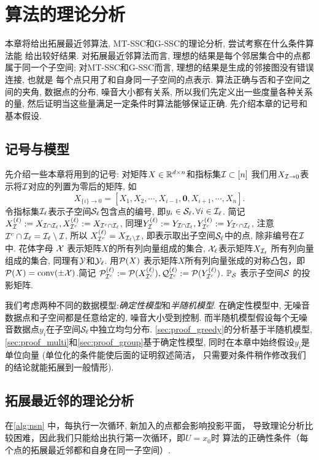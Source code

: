 \chapter{算法的理论分析}\label{chp:theory}
本章将给出拓展最近邻算法, MT-SSC和G-SSC的理论分析, 尝试考察在什么条件算法能
给出较好结果. 对拓展最近邻算法而言, 理想的结果是每个邻居集合中的点都属于同一个子空间;
对MT-SSC和G-SSC而言, 理想的结果是生成的邻接图没有错误连接, 也就是
每个点只用了和自身同一子空间的点表示. 算法正确与否和子空间之间的夹角, 
数据点的分布, 噪音大小都有关系, 所以我们先定义出一些度量各种关系的量,
然后证明当这些量满足一定条件时算法能够保证正确. 先介绍本章的记号和基本假设.

\section{记号与模型}
先介绍一些本章将用到的记号:
对矩阵\(X\in\mathbb{R}^{d\times n}\)和指标集\(\mathcal{I} \subset [n]\)
我们用\(X_{\mathcal{I}\rightarrow 0}\)表示将\(\mathcal{I}\)对应的列置为零后的矩阵,
如
\[
  X_{\{i\}\rightarrow 0} = \left[ X_1, X_2, \cdots, X_{i-1}, \mathbf{0},
  X_{i+1}, \cdots, X_n \right].
\]
令指标集\(\mathcal{I}_\ell\)表示子空间\(\mathcal{S}_\ell\)包含点的编号,
即\(y_i\in \mathcal{S}_\ell, \forall i\in \mathcal{I}_\ell\).
简记\(X_{\mathcal{I}}^{(\ell)}:=X_{\mathcal{I}\cap\mathcal{I}_\ell}, X_{\mathcal{I}^c}^{(\ell)}:=X_{\mathcal{I}^c\cap \mathcal{I}_\ell}\),
同理\(Y_{\mathcal{I}}^{(\ell)}:=Y_{\mathcal{I}\cap \mathcal{I}_\ell}, Y_{\mathcal{I}^c}^{(\ell)}:=Y_{\mathcal{I}^c\cap
\mathcal{I}_\ell}\),
注意 \(\mathcal{I}^c \cap \mathcal{I}_\ell = \mathcal{I}_\ell \setminus \mathcal{I}\), 所以
\(X_{\mathcal{I}^c}^{(\ell)} = X_{\mathcal{I}_\ell \setminus \mathcal{I}}\),
即表示取出子空间\(\mathcal{S}_\ell\)中的点, 除非编号在\(\mathcal{I}\)中.
花体字母 \(\mathcal{X}\) 表示矩阵\(X\)的所有列向量组成的集合, \(\mathcal{X}_\ell\)表示矩阵\(X_{\mathcal{I}_\ell}\)
所有列向量组成的集合, 同理有\(\mathcal{Y}\)和\(\mathcal{Y}_\ell\).
用\(\mathcal{P}(X)\) 表示矩阵\(X\)所有列向量张成的对称凸包，即
\(\mathcal{P}(X) = \mathrm{conv}(\pm \mathcal{X})\).简记
\(\mathcal{P}_{\mathcal{I}^c}^{(\ell)} := \mathcal{P}(X_{\mathcal{I}^c}^{(\ell)}),
\mathcal{Q}_{\mathcal{I}^c}^{(\ell)} :=\mathcal{P}(Y_{\mathcal{I}^c}^{(\ell)})\).
\(\mathbb{P}_{\mathcal{S}}\) 表示子空间\(\mathcal{S}\) 的投影矩阵.

我们考虑两种不同的数据模型:\emph{确定性模型}和\emph{半随机模型}\cite[1.4.1]{soltanolkotabi2012geometric}.
在确定性模型中, 无噪音数据点和子空间都是任意给定的, 噪音大小受到控制.
而半随机模型假设每个无噪音数据点\(y_i\)在子空间\(\mathcal{S}_\ell\)中独立均匀分布.
\autoref{sec:proof_greedy}的分析基于半随机模型,
\autoref{sec:proof_multi}和\autoref{sec:proof_group}基于确定性模型,
同时在本章中始终假设\(y_i\)是单位向量 (单位化的条件能使后面的证明叙述简洁，
只需要对条件稍作修改我们的结论就能拓展到一般情形).

\section{拓展最近邻的理论分析}\label{sec:proof_greedy}
在\autoref{alg:nsn} 中，每执行一次循环, 新加入的点都会影响投影平面，
导致理论分析比较困难，因此我们只能给出执行第一次循环，即\(U=x_0\)时
算法的正确性条件（每个点的拓展最近邻都和自身在同一子空间）.

